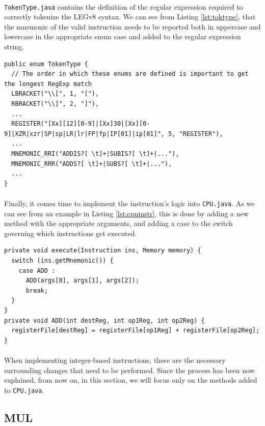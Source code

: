 \paragraph{}
\verb|TokenType.java| contains the definition of the regular expression required to correctly tokenize the LEGv8 syntax. We can see from Listing \ref{lst:toktype}, that the mnemonic of the valid instruction needs to be reported both in uppercase and lowercase in the appropriate enum case and added to the regular expression string.
\begin{lstlisting}[float, caption={Validating the syntax with regular expressions}, label={lst:toktype}]
public enum TokenType {
  // The order in which these enums are defined is important to get the longest RegExp match
  LBRACKET("\\[", 1, "["),
  RBRACKET("\\]", 2, "]"),
  ...
  REGISTER("[Xx][12][0-9]|[Xx]30|[Xx][0-9]|XZR|xzr|SP|sp|LR|lr|FP|fp|IP[01]|ip[01]", 5, "REGISTER"),
  ...
  MNEMONIC_RRI("ADDIS?[ \t]+|SUBIS?[ \t]+|..."),
  MNEMONIC_RRR("ADDS?[ \t]+|SUBS?[ \t]+|..."),
  ...
}
\end{lstlisting}
\paragraph{}
Finally, it comes time to implement the instruction's logic into \verb|CPU.java|. As we can see from an example in Listing \ref{lst:cpuinstr}, this is done by adding a new method with the appropriate arguments, and adding a case to the switch governing which instructions get executed. 
\begin{lstlisting}[float, caption={How an instruction is executed}, label={lst:cpuinstr}]
private void execute(Instruction ins, Memory memory) {
  switch (ins.getMnemonic()) {
    case ADD :
      ADD(args[0], args[1], args[2]);
      break;
  }
}
private void ADD(int destReg, int op1Reg, int op2Reg) {
  registerFile[destReg] = registerFile[op1Reg] + registerFile[op2Reg];
}
\end{lstlisting}
\paragraph{}
When implementing integer-based instructions, these are the necessary surrounding changes that need to be performed. Since the process has been now explained, from now on, in this section, we will focus only on the methods added to \verb|CPU.java|.
\subsection{MUL}
